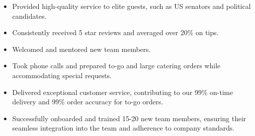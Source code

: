 

\begin{itemize}
\item Provided high-quality service to elite guests, such as US senators and political candidates. 
\item Consistently received 5 star reviews and averaged over 20\% on tips.
\item Welcomed and mentored new team members.
\end{itemize}

\divider

\begin{itemize}
\item Took phone calls and prepared to-go and large catering orders while accommodating special requests.
\item Delivered exceptional customer service, contributing to our 99\% on-time delivery and 99\% order accuracy for to-go orders.
\item Successfully onboarded and trained 15-20 new team members, ensuring their seamless integration into the team and adherence to company standards.
\end{itemize}
